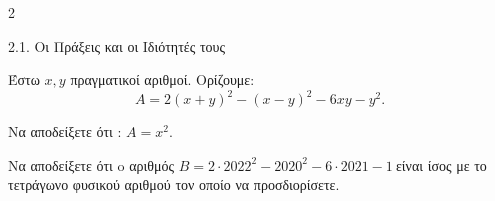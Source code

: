 \begin{ylh}{2}
    \item 2.1. Οι Πράξεις και οι Ιδιότητές τους
\end{ylh}
Έστω $x,y$ πραγματικοί αριθμοί. Ορίζουμε: \[A = 2(x + y)^{2} - (x - y)^{2} - 6xy - y^{2}.\]
\begin{alist}
\item Να αποδείξετε ότι : $A = x^{2}$.
\item Να αποδείξετε ότι o αριθμός $B = 2 \cdot 2022^{2} - 2020^{2} - 6 \cdot 2021 - 1\ $είναι ίσος με το τετράγωνο φυσικού αριθμού τον οποίο να προσδιορίσετε.
\end{alist}

